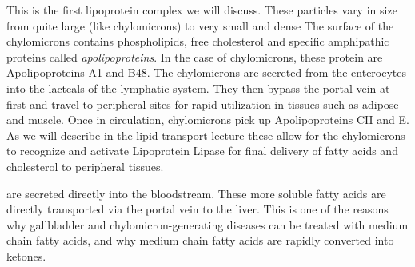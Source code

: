 \documentclass{tufte-handout}
\begin{document}
  This is the first lipoprotein complex we will discuss.  These particles vary in size from quite large (like chylomicrons) to very small and dense  The surface of the chylomicrons contains phospholipids, free cholesterol and specific amphipathic proteins called \emph{apolipoproteins}.  In the case of chylomicrons, these protein are Apolipoproteins A1 and B48.  The chylomicrons are secreted from the enterocytes into the lacteals of the lymphatic system.  They then bypass the portal vein at first and travel to peripheral sites for rapid utilization in tissues such as adipose and muscle.  Once in circulation, chylomicrons pick up Apolipoproteins CII and E.  As we will describe in the lipid transport lecture these allow for the chylomicrons to recognize and activate Lipoprotein Lipase for final delivery of fatty acids and cholesterol to peripheral tissues.  

 are secreted directly into the bloodstream.  These more soluble fatty acids are directly transported via the portal vein to the liver.  This is one of the reasons why gallbladder and chylomicron-generating diseases can be treated with medium chain fatty acids, and why medium chain fatty acids are rapidly converted into ketones.




\end{document}
